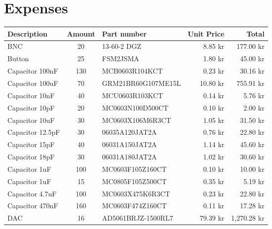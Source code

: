 \chapter{Expenses}
\label{tbl:material-cost}
\begin{longtable}{|p{3cm}|c|p{4.3cm}|r|r|}%

    \hline
    \textbf{Description}    & \textbf{Amount} & \textbf{Part number} & \textbf{Unit Price} & \textbf{Total} \\ \hline
    BNC                     & 20    & 13-60-2 DGZ               & 8.85 kr    & 177.00 kr   \\ \hline
    Button                  & 25    & FSM2JSMA                  & 1.80 kr    & 45.00 kr    \\ \hline
    Capacitor 100nF         & 130   & MCB0603R104KCT            & 0.23 kr    & 30.16 kr    \\ \hline
    Capacitor 100uF         & 70    & GRM21BR60G107ME15L        & 10.80 kr   & 755.91 kr   \\ \hline
    Capacitor 10nF          & 40    & MCU0603R103KCT            & 0.14 kr    & 5.76 kr     \\ \hline
    Capacitor 10pF          & 20    & MC0603N100D500CT          & 0.10 kr    & 2.00 kr     \\ \hline
    Capacitor 10uF          & 30    & MC0603X106M6R3CT          & 1.05 kr    & 31.50 kr    \\ \hline
    Capacitor 12.5pF        & 30    & 06035A120JAT2A            & 0.76 kr    & 22.80 kr    \\ \hline
    Capacitor 15pF          & 40    & 06031A150JAT2A            & 1.14 kr    & 45.60 kr    \\ \hline
    Capacitor 18pF          & 30    & 06031A180JAT2A            & 1.02 kr    & 30.60 kr    \\ \hline
    Capacitor 1uF           & 100   & MC0603F105Z160CT          & 0.10 kr    & 10.00 kr    \\ \hline
    Capacitor 1uF           & 15    & MC0805F105Z500CT          & 0.35 kr    & 5.19 kr     \\ \hline
    Capacitor 4.7uF         & 100   & MC0603X475K6R3CT          & 0.23 kr    & 22.80 kr    \\ \hline
    Capacitor 470nF         & 160   & MC0603F474Z160CT          & 0.11 kr    & 17.28 kr    \\ \hline
    DAC                     & 16    & AD5061BRJZ-1500RL7	    & 79.39 kr   & 1,270.28 kr \\ \hline

\end{longtable}
